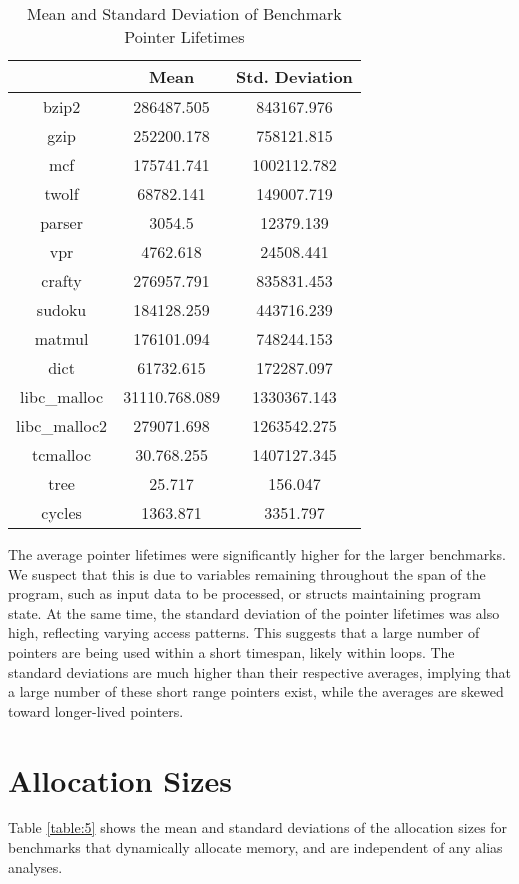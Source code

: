 \begin{table} [h!]
\centering
   \begin{tabular} {|c|c c|}
      \hline
      & Mean & Std. Deviation \\
      \hline
	   bzip2 & 286487.505 & 843167.976 \\
      \hline
	   gzip & 252200.178 & 758121.815 \\
      \hline
           mcf & 175741.741 & 1002112.782 \\
      \hline
	   twolf & 68782.141 & 149007.719 \\
      \hline
	   parser & 3054.5 & 12379.139 \\
      \hline
	   vpr & 4762.618 & 24508.441 \\
      \hline
	   crafty & 276957.791 & 835831.453 \\
      \hline
	   sudoku & 184128.259 & 443716.239 \\
      \hline
	   matmul & 176101.094 & 748244.153 \\
      \hline
	   dict & 61732.615 & 172287.097 \\
      \hline
	   libc\_malloc & 31110.768.089 & 1330367.143 \\
      \hline
	   libc\_malloc2 & 279071.698 & 1263542.275 \\
      \hline
	   tcmalloc & 30.768.255 & 1407127.345 \\
      \hline
	   tree & 25.717 & 156.047 \\
      \hline
	   cycles & 1363.871 & 3351.797 \\
      \hline
   \end{tabular}
   \caption{Mean and Standard Deviation of Benchmark Pointer Lifetimes}
   \label{table:4}
\end{table}

The average pointer lifetimes were significantly higher for the larger benchmarks. We suspect that this is due to variables remaining throughout the span of the program, such as input data to be processed, or structs maintaining program state. At the same time, the standard deviation of the pointer lifetimes was also high, reflecting varying access patterns. This suggests that a large number of pointers are being used within a short timespan, likely within loops. The standard deviations are much higher than their respective averages, implying that a large number of these short range pointers exist, while the averages are skewed toward longer-lived pointers.

\section{Allocation Sizes}
Table \ref{table:5} shows the mean and standard deviations of the allocation sizes for benchmarks that dynamically allocate memory, and are independent of any alias analyses.

